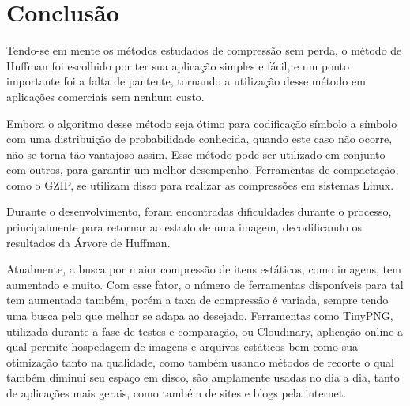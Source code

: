\chapter{Conclusão}
\label{c.conclusao}

Tendo-se em mente os métodos estudados de compressão sem perda, o método de Huffman foi escolhido por ter sua aplicação simples e fácil, e um ponto importante foi a falta de pantente, tornando a utilização desse método em aplicações comerciais sem nenhum custo.

Embora o algoritmo desse método seja ótimo para codificação símbolo a símbolo com uma distribuição de probabilidade conhecida, quando este caso não ocorre, não se torna tão vantajoso assim. Esse método pode ser utilizado em conjunto com outros, para garantir um melhor desempenho. Ferramentas de compactação, como o GZIP, se utilizam disso para realizar as compressões em sistemas Linux.

Durante o desenvolvimento, foram encontradas dificuldades durante o processo, principalmente para retornar ao estado de uma imagem, decodificando os resultados da Árvore de Huffman.

Atualmente, a busca por maior compressão de itens estáticos, como imagens, tem aumentado e muito. Com esse fator, o número de ferramentas disponíveis para tal tem aumentado também, porém a taxa de compressão é variada, sempre tendo uma busca pelo que melhor se adapa ao desejado. Ferramentas como TinyPNG, utilizada durante a fase de testes e comparação, ou Cloudinary, aplicação online a qual permite hospedagem de imagens e arquivos estáticos bem como sua otimização tanto na qualidade, como também usando métodos de recorte o qual também diminui seu espaço em disco, são amplamente usadas no dia a dia, tanto de aplicações mais gerais, como também de sites e blogs pela internet.
